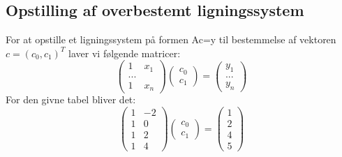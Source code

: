 \documentclass{article}
\begin{document}
\subsection{Opstilling af overbestemt ligningssystem}
For at opstille et ligningssystem på formen Ac=y til bestemmelse af vektoren 
$c=(c_0,c_1)^T$ laver vi følgende matricer:
$$\begin{pmatrix}
1&x_1\\
...\\
1&x_n
\end{pmatrix}
\begin{pmatrix}
c_0\\c_1
\end{pmatrix}
=
\begin{pmatrix}
y_1\\
...\\
y_n
\end{pmatrix}
$$
For den givne tabel bliver det:
$$\begin{pmatrix}
1&-2\\
1&0\\
1&2\\
1&4
\end{pmatrix}
\begin{pmatrix}
c_0\\c_1
\end{pmatrix}
=
\begin{pmatrix}
1\\
2\\
4\\
5
\end{pmatrix}
$$
\end{document}
